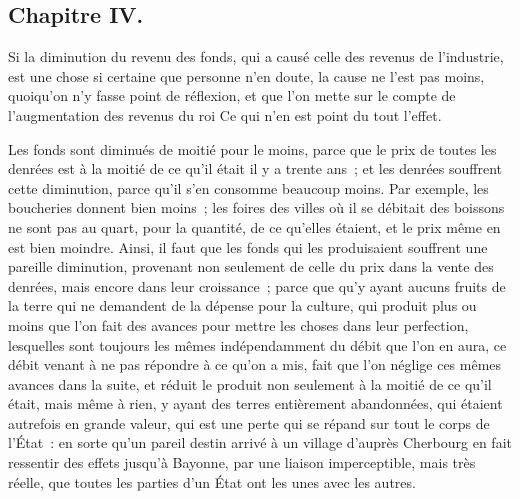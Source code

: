 \documentclass[french,twoside]{book} %
\begin{document}
\subsection[{Chapitre IV.}]{Chapitre IV.}
\noindent Si la diminution du revenu des fonds, qui a causé celle des revenus de l’industrie, est une chose si certaine que personne n’en doute, la cause ne l’est pas moins, quoiqu’on n’y fasse point de réflexion, et que l’on mette sur le compte de l’augmentation des revenus du roi Ce qui n’en est point du tout l’effet.\par
Les fonds sont diminués de moitié pour le moins, parce que le prix de toutes les denrées est à la moitié de ce qu’il était il y a trente ans ; et les denrées souffrent cette diminution, parce qu’il s’en consomme beaucoup moins. Par exemple, les boucheries donnent bien moins ; les foires des villes où il se débitait des boissons ne sont pas au quart, pour la quantité, de ce qu’elles étaient, et le prix même en est bien moindre. Ainsi, il faut que les fonds qui les produisaient souffrent une pareille diminution, provenant non seulement de celle du prix dans la vente des denrées, mais encore dans leur croissance ; parce que qu’y ayant aucuns fruits de la terre qui ne demandent de la dépense pour la culture, qui produit plus ou moins que l’on fait des avances pour mettre les choses dans leur perfection, lesquelles sont toujours les mêmes indépendamment du débit que l’on en aura, ce débit venant à ne pas répondre à ce qu’on a mis, fait que l’on néglige ces mêmes avances dans la suite, et réduit le produit non seulement à la moitié de ce qu’il était, mais même à rien, y ayant des terres entièrement abandonnées, qui étaient autrefois en grande valeur, qui est une perte qui se répand sur tout le corps de l’État : en sorte qu’un pareil destin arrivé à un village d’auprès Cherbourg en fait ressentir des effets jusqu’à Bayonne, par une liaison imperceptible, mais très réelle, que toutes les parties d’un État ont les unes avec les autres.
\end{document}
